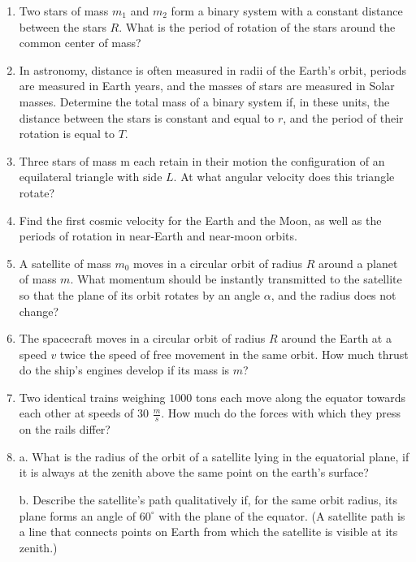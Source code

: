 \documentclass{article}
\begin{document}
\begin{enumerate}[label=2.6.\arabic*]
\item Two stars of mass $m_1$ and $m_2$ form a binary system with a constant distance between the stars $R$. What is the period of rotation of the stars around the common center of mass?

\item In astronomy, distance is often measured in radii of the Earth's orbit, periods are measured in Earth years, and the masses of stars are measured in Solar masses. Determine the total mass of a binary system if, in these units, the distance between the stars is constant and equal to $r$, and the period of their rotation is equal to $T$.

\item Three stars of mass m each retain in their motion the configuration of an equilateral triangle with side $L$. At what angular velocity does this triangle rotate?

\item Find the first cosmic velocity for the Earth and the Moon, as well as the periods of rotation in near-Earth and near-moon orbits.

\item A satellite of mass $m_0$ moves in a circular orbit of radius $R$ around a planet of mass $m$. What momentum should be instantly transmitted to the satellite so that the plane of its orbit rotates by an angle $\alpha$, and the radius does not change?

\item The spacecraft moves in a circular orbit of radius $R$ around the Earth at a speed $v$ twice the speed of free movement in the same orbit. How much thrust do the ship's engines develop if its mass is $m$?

\item Two identical trains weighing $1000$ tons each move along the equator towards each other at speeds of $30$ $\frac{m}{s}$. How much do the forces with which they press on the rails differ?

\item a. What is the radius of the orbit of a satellite lying in the equatorial plane, if it is always at the zenith above the same point on the earth's surface?

b. Describe the satellite's path qualitatively if, for the same orbit radius, its plane forms an angle of $60^\circ$ with the plane of the equator. (A satellite path is a line that connects points on Earth from which the satellite is visible at its zenith.)


\end{enumerate}
\end{document}
